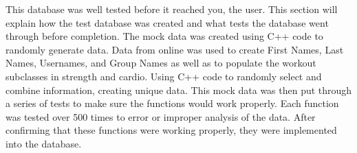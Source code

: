 This database was well tested before it reached you, the user. This section will explain how the test database was created and what tests the database went through before completion. The mock data was created using C++ code to randomly generate data. Data from online was used to create First Names, Last Names, Usernames, and Group Names as well as to populate the workout subclasses in strength and cardio. Using C++ code to randomly select and combine information, creating unique data. This mock data was then put through a series of tests to make sure the functions would work properly. Each function was tested over 500 times to error or improper analysis of the data. After confirming that these functions were working properly, they were implemented into the database.